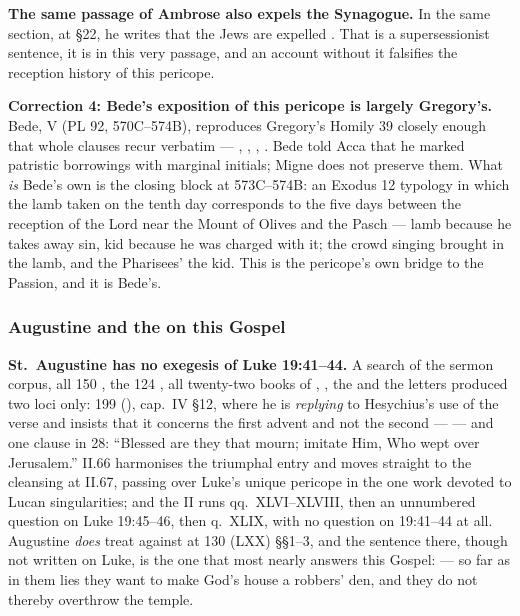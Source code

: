 \textbf{The same passage of Ambrose also expels the Synagogue.} In the same
section, at §22, he writes that the Jews are expelled
. That is a supersessionist sentence, it is in this
very passage, and an account without it falsifies the reception history of
this pericope.

\textbf{Correction 4: Bede's exposition of this pericope is largely
Gregory's.} Bede,  V (PL 92, 570C--574B),
reproduces Gregory's Homily 39 closely enough that whole clauses recur
verbatim --- , , , . Bede told Acca that he marked patristic borrowings with
marginal initials; Migne does not preserve them. What \textit{is} Bede's own
is the closing block at 573C--574B: an Exodus 12 typology in which the lamb
taken on the tenth day corresponds to the five days between the reception of
the Lord near the Mount of Olives and the Pasch --- lamb because he takes away
sin, kid because he was charged with it; the crowd singing  brought in the lamb, and the Pharisees'  the kid. This is the pericope's own bridge to the Passion,
and it is Bede's.

\subsubsection*{Augustine and the  on this Gospel}

\textbf{St.\ Augustine has no exegesis of Luke 19:41--44.} A search of the
sermon corpus, all 150 , the 124 ,
all twenty-two books of , , the  and the letters produced
two loci only:  199 (), cap.~IV §12,
where he is \textit{replying} to Hesychius's use of the verse and insists that
it concerns the first advent and not the second ---  --- and one clause in  28: ``Blessed are they that mourn; imitate Him, Who wept
over Jerusalem.''  II.66 harmonises the
triumphal entry and moves straight to the cleansing at II.67, passing over
Luke's unique pericope in the one work devoted to Lucan singularities; and the
 II runs qq.~XLVI--XLVIII, then an unnumbered
question on Luke 19:45--46, then q.~XLIX, with no question on 19:41--44 at all.
Augustine \textit{does} treat  against  at  130 (LXX) §§1--3, and the sentence there,
though not written on Luke, is the one that most nearly answers this Gospel:
 --- so far as in them lies they want to make God's
house a robbers' den, and they do not thereby overthrow the temple.


